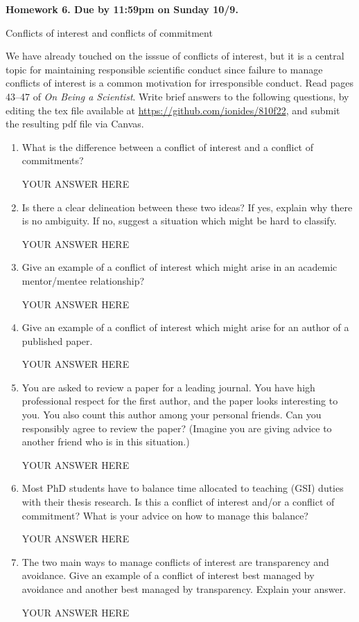 \documentclass[12pt]{article}
\begin{document}
\begin{center}\bf
Homework 6. Due by 11:59pm on Sunday 10/9.

Conflicts of interest and conflicts of commitment

\end{center}
We have already touched on the isssue of conflicts of interest, but it is a central topic for maintaining responsible scientific conduct since failure to manage conflicts of interest is a common motivation for irresponsible conduct. Read pages 43--47 of {\em On Being a Scientist}. Write brief answers to the following questions, by editing the tex file available at \url{https://github.com/ionides/810f22}, and submit the resulting pdf file via Canvas.

\begin{enumerate}

\item What is the difference between a conflict of interest and a conflict of commitments? 

YOUR ANSWER HERE

\item Is there a clear delineation between these two ideas? If yes, explain why there is no ambiguity. If no, suggest a situation which might be hard to classify.

YOUR ANSWER HERE

\item Give an example of a conflict of interest which might arise in an academic mentor/mentee relationship?

YOUR ANSWER HERE

\item Give an example of a conflict of interest which might arise for an author of a published paper.

YOUR ANSWER HERE

\item You are asked to review a paper for a leading journal. You have high professional respect for the first author, and the paper looks interesting to you. You also count this author among your personal friends. Can you responsibly agree to review the paper? (Imagine you are giving advice to another friend who is in this situation.)

YOUR ANSWER HERE

\item Most PhD students have to balance time allocated to teaching (GSI) duties with their thesis research. Is this a conflict of interest and/or a conflict of commitment? What is your advice on how to manage this balance?

YOUR ANSWER HERE

\item The two main ways to manage conflicts of interest are transparency and avoidance. Give an example of a conflict of interest best managed by avoidance and another best managed by transparency. Explain your answer.

YOUR ANSWER HERE

\end{enumerate}
\end{document}
